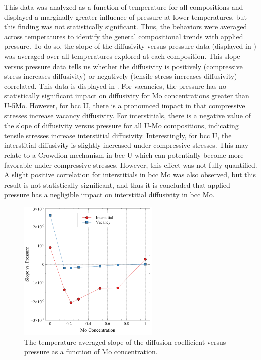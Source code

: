 \documentclass[review]{elsarticle}
\begin{document}
This data was analyzed as a function of temperature for all compositions and displayed a marginally greater influence of pressure at lower temperatures, but this finding was not statistically significant. Thus, the behaviors were averaged across temperatures to identify the general compositional trends with applied pressure. To do so, the slope of the diffusivity versus pressure data (displayed in ) was averaged over all temperatures explored at each composition. This slope versus pressure data tells us whether the diffusivity is positively (compressive stress increases diffusivity) or negatively (tensile stress increases diffusivity) correlated. This data is displayed in . For vacancies, the pressure has no statistically significant impact on diffusivity for Mo concentrations greater than U-5Mo. However, for bcc U, there is a pronounced impact in that compressive stresses increase vacancy diffusivity. For interstitials, there is a negative value of the slope of diffusivity versus pressure for all U-Mo compositions, indicating tensile stresses increase interstitial diffusivity. Interestingly, for bcc U, the interstitial diffusivity is slightly increased under compressive stresses. This may relate to a Crowdion mechanism \cite{crowdion} in bcc U which can potentially become more favorable under compressive stresses. However, this effect was not fully quantified. A slight positive correlation for interstitials in bcc Mo was also observed, but this result is not statistically significant, and thus it is concluded that applied pressure has a negligible impact on interstitial diffusivity in bcc Mo.

\begin{figure}[h!]
    \centering
    \includegraphics[width=0.6\textwidth]{avg_vs_p.pdf}
    \caption{The temperature-averaged slope of the diffusion coefficient versus pressure as a function of Mo concentration.}
    \label{fig:avg_vs_p}
\end{figure}
\end{document}
